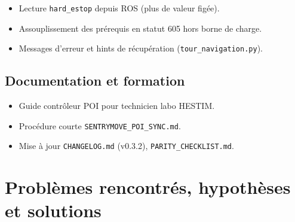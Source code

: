\documentclass[11pt,a4paper]{article}
\begin{document}
\begin{itemize}[noitemsep]
  \item Lecture \texttt{hard\_estop} depuis ROS (plus de valeur figée).
  \item Assouplissement des prérequis en statut 605 hors borne de charge.
  \item Messages d'erreur et hints de récupération (\texttt{tour\_navigation.py}).
\end{itemize}

\subsection{Documentation et formation}

\begin{itemize}[noitemsep]
  \item Guide contrôleur POI pour technicien labo HESTIM.
  \item Procédure courte \texttt{SENTRYMOVE\_POI\_SYNC.md}.
  \item Mise à jour \texttt{CHANGELOG.md} (v0.3.2), \texttt{PARITY\_CHECKLIST.md}.
\end{itemize}

\section{Problèmes rencontrés, hypothèses et solutions}
\end{document}
